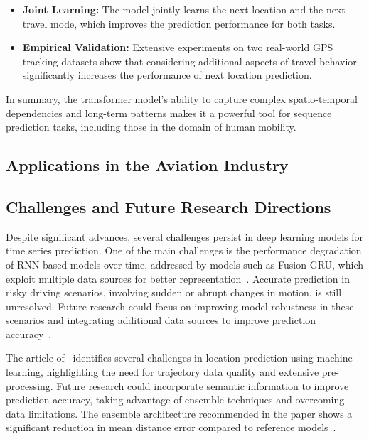 \documentclass[12pt,oneside]{book} %
\begin{document}
\begin{itemize}
    \item \textbf{Joint Learning:} The model jointly learns the next location and the next travel mode, which improves the prediction performance for both tasks.
    \item \textbf{Empirical Validation:} Extensive experiments on two real-world GPS tracking datasets show that considering additional aspects of travel behavior significantly increases the performance of next location prediction.
\end{itemize}

In summary, the transformer model's ability to capture complex spatio-temporal
dependencies and long-term patterns makes it a powerful tool for sequence
prediction tasks, including those in the domain of human mobility.

\subsection{Applications in the Aviation Industry}

\subsection{Challenges and Future Research Directions}
Despite significant advances, several challenges persist in deep learning
models for time series prediction. One of the main challenges is the
performance degradation of RNN-based models over time, addressed by models such
as Fusion-GRU, which exploit multiple data sources for better
representation~\cite{FusionGRU}. Accurate prediction in risky driving
scenarios, involving sudden or abrupt changes in motion, is still unresolved.
Future research could focus on improving model robustness in these scenarios
and integrating additional data sources to improve prediction
accuracy~\cite{FusionGRU}.

The article of~\citet{MLTechniqueFPP} identifies several challenges in location
prediction using machine learning, highlighting the need for trajectory data
quality and extensive pre-processing. Future research could incorporate
semantic information to improve prediction accuracy, taking advantage of
ensemble techniques and overcoming data limitations. The ensemble architecture
recommended in the paper shows a significant reduction in mean distance error
compared to reference models~\cite{MLTechniqueFPP}.

%
\end{document}
